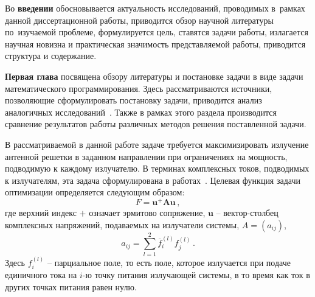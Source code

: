 Во {\textbf{введении}} обосновывается актуальность
исследований, проводимых в~рамках данной диссертационной работы,
приводится обзор научной литературы по~изучаемой проблеме,
формулируется цель, ставятся задачи работы, излагается научная новизна
и практическая значимость представляемой работы, приводится структура и содержание.

{\textbf{Первая глава}} посвящена обзору литературы и постановке задачи в виде задачи математического программирования. Здесь рассматриваются источники, позволяющие сформулировать постановку задачи, приводится анализ аналогичных
исследований~. Также в рамках этого раздела производится сравнение результатов работы различных методов решения поставленной задачи.

В рассматриваемой в данной работе задаче требуется максимизировать излучение антенной решетки в заданном направлении при ограничениях на мощность, подводимую к каждому излучателю. В терминах комплексных токов, подводимых к излучателям, эта задача сформулирована в работах~. Целевая функция задачи оптимизации определяется следующим образом:
%
    \begin{equation}
        F = \textbf{u}^{+}\textbf{Au} \, ,
        \label{eq:F_0}
    \end{equation}
%
где верхний индекс $+$ означает эрмитово сопряжение, $\textbf{u}$ -- вектор-столбец комплексных напряжений, подаваемых на излучатели системы, $A = (a_{ij})$,
%
     \begin{equation}
        a_{ij} = \sum_{l=1}^2\overline{f}_{i}^{(l)}f_{j}^{(l)}
        \label{eq:A_0} \, .
    \end{equation}
%
Здесь $f_i^{(l)}$ -- парциальное поле, то есть поле, которое излучается при подаче единичного тока на $i$-ю точку питания излучающей системы, в то время как ток в других точках питания равен нулю.

